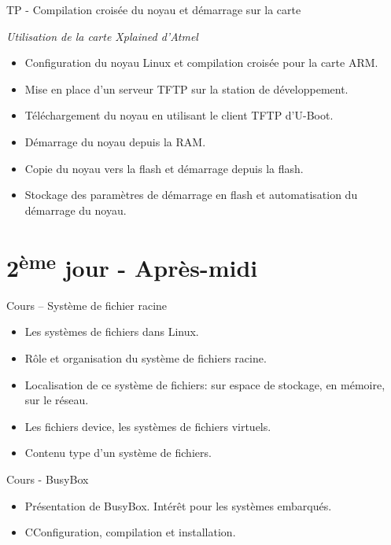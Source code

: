 \documentclass[a4paper,12pt,obeyspaces,spaces,hyphens]{article}
\begin{document}
\feagendaonecolumn
{TP - Compilation croisée du noyau et démarrage sur la carte}
{
  {\em Utilisation de la carte Xplained d'Atmel}
  \begin{itemize}
  \item Configuration du noyau Linux et compilation croisée pour la carte ARM.
  \item Mise en place d'un serveur TFTP sur la station de développement.
  \item Téléchargement du noyau en utilisant le client TFTP d'U-Boot.
  \item Démarrage du noyau depuis la RAM.
  \item Copie du noyau vers la flash et démarrage depuis la flash.
  \item Stockage des paramètres de démarrage en flash et automatisation
	du démarrage du noyau.
  \end{itemize}
}

\section{2\textsuperscript{ème} jour - Après-midi}

\feagendatwocolumn
{Cours – Système de fichier racine}
{
  \begin{itemize}
  \item Les systèmes de fichiers dans Linux.
  \item Rôle et organisation du système de fichiers racine.
  \item Localisation de ce système de fichiers: sur espace
	de stockage, en mémoire, sur le réseau.
  \item Les fichiers device, les systèmes de fichiers virtuels.
  \item Contenu type d'un système de fichiers.
  \end{itemize}
}
{Cours - BusyBox}
{
  \begin{itemize}
  \item Présentation de BusyBox. Intérêt pour les systèmes embarqués.
  \item CConfiguration, compilation et installation.
  \end{itemize}
}
\end{document}
